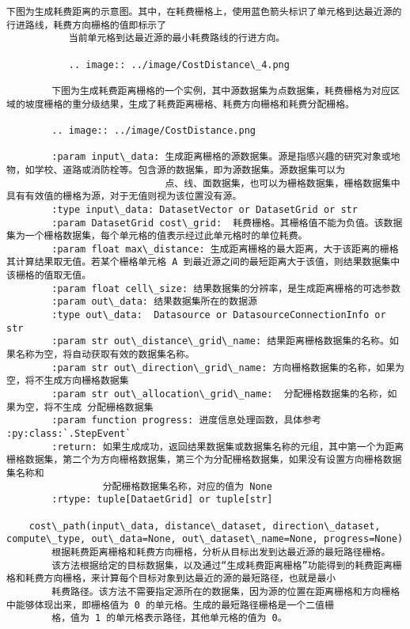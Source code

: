\documentclass[11pt]{article}
\begin{document}
\begin{Verbatim}[commandchars=\\\{\}]
           下图为生成耗费距离的示意图。其中，在耗费栅格上，使用蓝色箭头标识了单元格到达最近源的行进路线，耗费方向栅格的值即标示了
           当前单元格到达最近源的最小耗费路线的行进方向。
        
           .. image:: ../image/CostDistance\_4.png
        
        下图为生成耗费距离栅格的一个实例，其中源数据集为点数据集，耗费栅格为对应区域的坡度栅格的重分级结果，生成了耗费距离栅格、耗费方向栅格和耗费分配栅格。
        
        .. image:: ../image/CostDistance.png
        
        :param input\_data: 生成距离栅格的源数据集。源是指感兴趣的研究对象或地物，如学校、道路或消防栓等。包含源的数据集，即为源数据集。源数据集可以为
                            点、线、面数据集，也可以为栅格数据集，栅格数据集中具有有效值的栅格为源，对于无值则视为该位置没有源。
        :type input\_data: DatasetVector or DatasetGrid or str
        :param DatasetGrid cost\_grid:  耗费栅格。其栅格值不能为负值。该数据集为一个栅格数据集，每个单元格的值表示经过此单元格时的单位耗费。
        :param float max\_distance: 生成距离栅格的最大距离，大于该距离的栅格其计算结果取无值。若某个栅格单元格 A 到最近源之间的最短距离大于该值，则结果数据集中该栅格的值取无值。
        :param float cell\_size: 结果数据集的分辨率，是生成距离栅格的可选参数
        :param out\_data: 结果数据集所在的数据源
        :type out\_data:  Datasource or DatasourceConnectionInfo or str
        :param str out\_distance\_grid\_name: 结果距离栅格数据集的名称。如果名称为空，将自动获取有效的数据集名称。
        :param str out\_direction\_grid\_name: 方向栅格数据集的名称，如果为空，将不生成方向栅格数据集
        :param str out\_allocation\_grid\_name:  分配栅格数据集的名称，如果为空，将不生成 分配栅格数据集
        :param function progress: 进度信息处理函数，具体参考 :py:class:`.StepEvent`
        :return: 如果生成成功，返回结果数据集或数据集名称的元组，其中第一个为距离栅格数据集，第二个为方向栅格数据集，第三个为分配栅格数据集，如果没有设置方向栅格数据集名称和
                 分配栅格数据集名称，对应的值为 None
        :rtype: tuple[DataetGrid] or tuple[str]
    
    cost\_path(input\_data, distance\_dataset, direction\_dataset, compute\_type, out\_data=None, out\_dataset\_name=None, progress=None)
        根据耗费距离栅格和耗费方向栅格，分析从目标出发到达最近源的最短路径栅格。
        该方法根据给定的目标数据集，以及通过“生成耗费距离栅格”功能得到的耗费距离栅格和耗费方向栅格，来计算每个目标对象到达最近的源的最短路径，也就是最小
        耗费路径。该方法不需要指定源所在的数据集，因为源的位置在距离栅格和方向栅格中能够体现出来，即栅格值为 0 的单元格。生成的最短路径栅格是一个二值栅
        格，值为 1 的单元格表示路径，其他单元格的值为 0。
        

\end{Verbatim}
\end{document}
